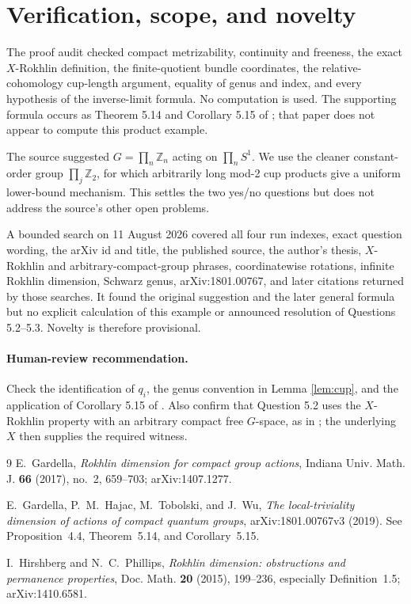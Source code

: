 \documentclass[11pt]{article}
\begin{document}
\section{Verification, scope, and novelty}

The proof audit checked compact metrizability, continuity and freeness, the exact \(X\)-Rokhlin definition, the finite-quotient bundle coordinates, the relative-cohomology cup-length argument, equality of genus and index, and every hypothesis of the inverse-limit formula. No computation is used. The supporting formula occurs as Theorem 5.14 and Corollary 5.15 of \cite{GHTW}; that paper does not appear to compute this product example.

The source suggested \(G=\prod_n\mathbb Z_n\) acting on \(\prod_nS^1\). We use the cleaner constant-order group \(\prod_j\mathbb Z_2\), for which arbitrarily long mod-2 cup products give a uniform lower-bound mechanism. This settles the two yes/no questions but does not address the source's other open problems.

A bounded search on 11 August 2026 covered all four run indexes, exact question wording, the arXiv id and title, the published source, the author's thesis, \(X\)-Rokhlin and arbitrary-compact-group phrases, coordinatewise rotations, infinite Rokhlin dimension, Schwarz genus, arXiv:1801.00767, and later citations returned by those searches. It found the original suggestion and the later general formula but no explicit calculation of this example or announced resolution of Questions 5.2--5.3. Novelty is therefore provisional.

\paragraph{Human-review recommendation.}
Check the identification of \(q_i\), the genus convention in Lemma \ref{lem:cup}, and the application of Corollary 5.15 of \cite{GHTW}. Also confirm that Question 5.2 uses the \(X\)-Rokhlin property with an arbitrary compact free \(G\)-space, as in \cite{HP}; the underlying \(X\) then supplies the required witness.

\begin{thebibliography}{9}
E.~Gardella,
\emph{Rokhlin dimension for compact group actions},
Indiana Univ. Math. J. \textbf{66} (2017), no.~2, 659--703;
arXiv:1407.1277.

E.~Gardella, P.~M.~Hajac, M.~Tobolski, and J.~Wu,
\emph{The local-triviality dimension of actions of compact quantum groups},
arXiv:1801.00767v3 (2019). See Proposition~4.4, Theorem~5.14, and Corollary~5.15.

I.~Hirshberg and N.~C.~Phillips,
\emph{Rokhlin dimension: obstructions and permanence properties},
Doc. Math. \textbf{20} (2015), 199--236, especially Definition~1.5;
arXiv:1410.6581.
\end{thebibliography}
\end{document}
